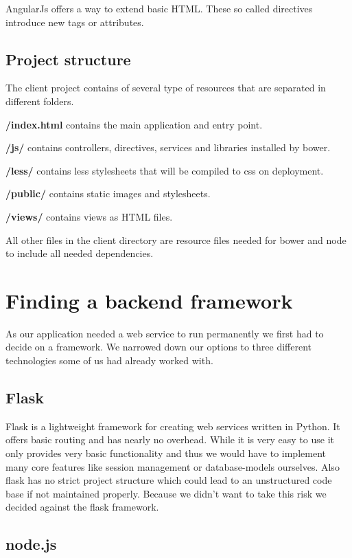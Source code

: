 AngularJs offers a way to extend basic HTML. These so called directives
introduce new tags or attributes.

\subsection{Project structure}\label{project-structure}

The client project contains of several type of resources that are
separated in different folders.

\textbf{/index.html} contains the main application and entry point.

\textbf{/js/} contains controllers, directives, services and libraries
installed by bower.

\textbf{/less/} contains less stylesheets that will be compiled to css
on deployment.

\textbf{/public/} contains static images and stylesheets.

\textbf{/views/} contains views as HTML files.

All other files in the client directory are resource files needed for
bower and node to include all needed dependencies.

\newpage
\section{Finding a backend framework}\label{finding-a-backend-framework}

As our application needed a web service to run permanently we first had
to decide on a framework. We narrowed down our options to three
different technologies some of us had already worked with.

\subsection{Flask}\label{flask}

Flask is a lightweight framework for creating web services written in
Python. It offers basic routing and has nearly no overhead. While it is
very easy to use it only provides very basic functionality and thus we
would have to implement many core features like session management or
database-models ourselves. Also flask has no strict project structure
which could lead to an unstructured code base if not maintained
properly. Because we didn't want to take this risk we decided against
the flask framework.

\subsection{node.js}\label{node.js}

